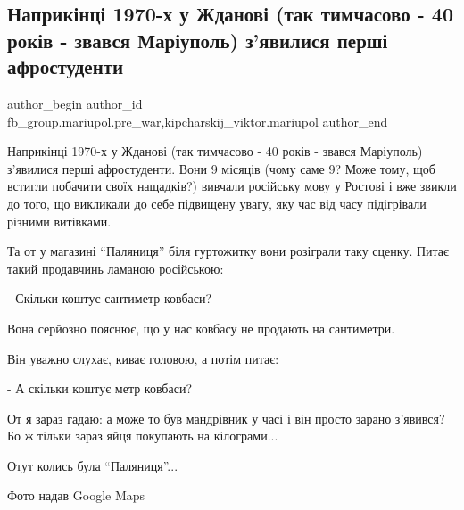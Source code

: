  
 
 
 
 

\subsection{Наприкінці 1970-х у Жданові (так тимчасово - 40 років - звався Маріуполь) з'явилися перші афростуденти}
\label{sec:25_01_2023.fb.fb_group.mariupol.pre_war.1.naprik_nts__1970_kh_}
 
\ifcmt
 author_begin
   author_id fb_group.mariupol.pre_war,kipcharskij_viktor.mariupol
 author_end
\fi

Наприкінці 1970-х у Жданові (так тимчасово - 40 років - звався Маріуполь)
з'явилися перші афростуденти. Вони 9 місяців (чому саме 9? Може тому, щоб
встигли побачити своїх нащадків?) вивчали російську мову у Ростові і вже звикли
до того, що викликали до себе підвищену увагу, яку час від часу підігрівали
різними витівками.

Та от у магазині \enquote{Паляниця} біля гуртожитку вони розіграли таку сценку. Питає
такий продавчинь ламаною російською:

- Скільки коштує сантиметр ковбаси?

Вона серйозно пояснює, що у нас ковбасу не продають на сантиметри.

Він уважно слухає, киває головою, а потім питає:

- А скільки коштує метр ковбаси?

От я зараз гадаю: а може то був мандрівник у часі і він просто зарано з'явився?
Бо ж тільки зараз яйця покупають на кілограми...  🤔🤓😁

Отут колись була \enquote{Паляниця}...

Фото надав Google Maps
